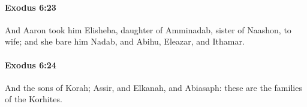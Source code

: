 		\paragraph{Exodus 6:23} %
			\label{EXODUS-6-23}

			And Aaron took him Elisheba, daughter of Amminadab, sister of Naashon, to wife; and she bare him Nadab, and Abihu, Eleazar, and Ithamar.


		\paragraph{Exodus 6:24} %
			\label{EXODUS-6-24}

			And the sons of Korah; Assir, and Elkanah, and Abiasaph: these are the families of the Korhites.


